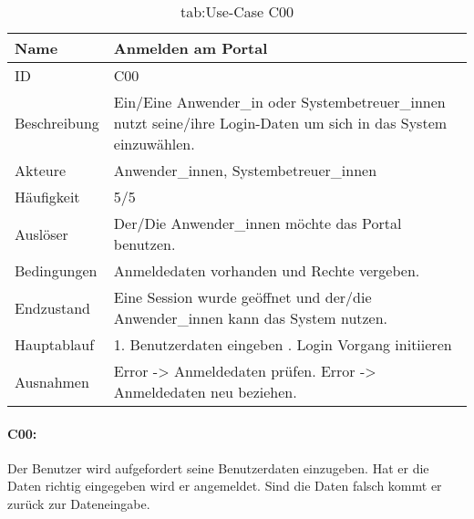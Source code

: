 \def \currentAuthor{Das Projektteam}
\renewcommand{\arraystretch}{1.3}

\begin{table}[h]
	\begin{tabular}{|p{3cm}|p{10.7cm}|}
		\hline
		Name & Anmelden am Portal\\
		\hline
		ID &  C00\\
		\hline
		Beschreibung & Ein/Eine Anwender\_in oder Systembetreuer\_innen nutzt seine/ihre Login-Daten um sich in das System einzuwählen.\\
		\hline
		Akteure & Anwender\_innen, Systembetreuer\_innen\\
		\hline
		Häufigkeit & 5/5\\
		\hline
		Auslöser & Der/Die Anwender\_innen möchte das Portal benutzen.\\
		\hline
		Bedingungen & Anmeldedaten vorhanden und Rechte vergeben. \\
		\hline
		Endzustand & Eine Session wurde geöffnet und der/die Anwender\_innen kann das System nutzen.\\
		\hline
		Hauptablauf & 1. Benutzerdaten eingeben \newline2. Login Vorgang  initiieren \\
		\hline
		Ausnahmen & Error -> Anmeldedaten prüfen. Error -> Anmeldedaten neu beziehen.\\
		\hline
	\end{tabular}
	\caption{tab:Use-Case C00}
\end{table}
\label{tab:tab:Use-Case C00}
\vspace{-.5cm}
\paragraph{C00:}
Der Benutzer wird aufgefordert seine Benutzerdaten einzugeben.
Hat er die Daten richtig eingegeben wird er angemeldet. Sind die Daten falsch kommt er zurück zur Dateneingabe.


